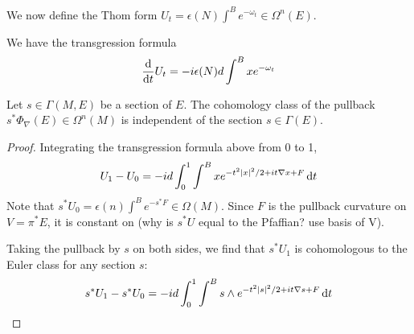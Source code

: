 We now define the Thom form $U_t = \epsilon(N) \int^B e^{-\omega_t} \in
\Omega^n(E)$. 


\begin{comment} %
Let $E=P\times_\rho V$ be the associated bundle to $P$ with rank $2m$. 
basic forms on $P\times V$ are in correspondence with forms on  $E$.

A representative for the Thom class, called the Mathai-Quillen Thom form, is
given by
\begin{equation} \label{eq:mathai_quillen}
\Phi_\nabla(E) = \frac{1}{(2\pi)^m} e^{-v_a^2/2} \int \odif{\chi} 
\exp(\chi_a\Omega^{ab}\chi_b /2 + i\nabla v^a \chi_a)
\end{equation}
where $v^a \in \Omega^0(P\times V)$ are coordinates on $V$, and $\nabla v^a \in
\Omega^1(P\times V)$ is the exterior covariant derivative of $v^a$.
Not well defined globally, since using trivialisation to use coordinates? 

We claim that this defines a basic form in $\Omega^{2m}_\rho(P\times V)$,
and that it is a representative of the Thom class. 

To show that it is a basic form, we need to prove it is horizontal and $\rho$
equivariant.  

To show that is is a representative of the Thom class, we need to prove it is
closed and satisfies  $\pi^*\Phi_\nabla(E) = 1$.

Pullback by zero section is Pfaffian.
\end{comment} 

\begin{prop} %
	We have the transgression formula
	\[
	\odv{}{t} U_t = -i\epsilon(N) d\int^B x e^{-\omega_t}
	\] 
\end{prop}
\begin{prop} \label{prop:thom_pullback}
	Let $s\in \Gamma(M,E)$ be a section of $E$.
	The cohomology class of the pullback $s^*\Phi_\nabla(E) \in \Omega^{n}(M)$
	is independent of the section  $s\in\Gamma(E)$.
\end{prop}
\begin{proof}
	Integrating the transgression formula above from 0 to 1, 
	\[
		U_1 - U_0 = -id\int_0^1\int^B x e^{-t^2\abs{x}^2/2 +
		it\nabla x + F} \odif{t}
	\] 
	Note that $s^*U_0 = \epsilon(n)\int^B e^{-s^*F} \in \Omega(M)$. Since $F$ is
	the pullback curvature on $V = \pi^*E$, it is constant on 
	(why is $s^*U$ equal to the Pfaffian? use basis of V).

	Taking the pullback by $s$ on both sides, we find that $s^*U_1$ is
	cohomologous to the Euler class for any section $s$:  
	\[
		s^*U_1 - s^*U_0 = -id\int_0^1\int^B s\wedge e^{-t^2\abs{s}^2/2 +
		it\nabla s + F} \odif{t}
	\] 
\end{proof}

